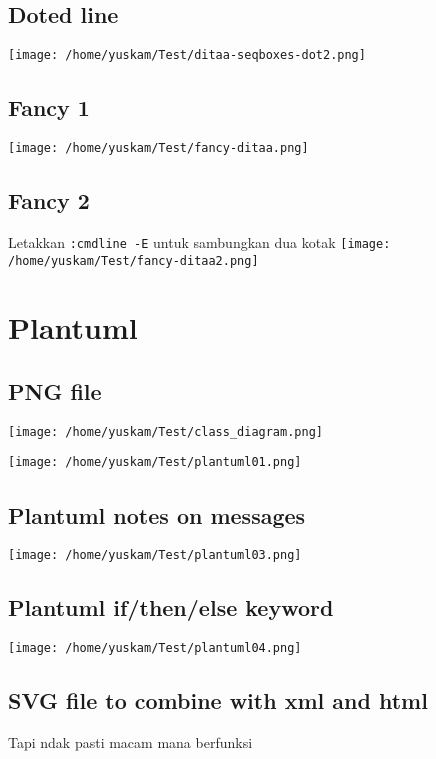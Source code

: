 \documentclass[11pt]{article}
\begin{document}
\subsection{Doted line}
\label{sec:orgae2bfe9}
\texttt{[image: /home/yuskam/Test/ditaa-seqboxes-dot2.png]}

\subsection{Fancy 1}
\label{sec:orga51067c}
\texttt{[image: /home/yuskam/Test/fancy-ditaa.png]}

\subsection{Fancy 2}
\label{sec:org80e947a}
Letakkan \texttt{:cmdline -E} untuk sambungkan dua kotak
\texttt{[image: /home/yuskam/Test/fancy-ditaa2.png]}

\section{Plantuml}
\label{sec:org12fcb9f}

\subsection{PNG file}
\label{sec:org5adf10e}
\texttt{[image: /home/yuskam/Test/class\_diagram.png]}


\texttt{[image: /home/yuskam/Test/plantuml01.png]}
\subsection{Plantuml notes on messages}
\label{sec:orgef57db3}

\texttt{[image: /home/yuskam/Test/plantuml03.png]}
\subsection{Plantuml if/then/else keyword}
\label{sec:org654c2ad}

\texttt{[image: /home/yuskam/Test/plantuml04.png]}

\subsection{SVG file to combine with xml and html}
\label{sec:org74abfa4}
Tapi ndak pasti macam mana berfunksi
\end{document}
